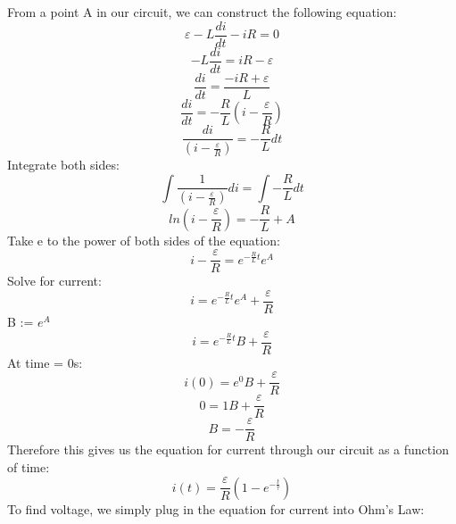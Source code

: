 \documentclass[../Lab.tex]{subfiles}
\begin{document}
From a point A in our circuit, we can construct the following equation:
\begin{equation}
    \varepsilon - L\frac{di}{dt} - iR = 0
\end{equation}
\begin{equation}
    -L\frac{di}{dt} = iR - \varepsilon
\end{equation}
\begin{equation}
    \frac{di}{dt} = \frac{- iR + \varepsilon}{L}
\end{equation}
\begin{equation}
    \frac{di}{dt} = -\frac{R}{L}(i-\frac{\varepsilon}{R})
\end{equation}
\begin{equation}
    \frac{di}{(i-\frac{\varepsilon}{R})} = -\frac{R}{L}dt
\end{equation}
Integrate both sides:
\begin{equation}
    \int{\frac{1}{(i-\frac{\varepsilon}{R})}di} = \int{-\frac{R}{L}dt}
\end{equation}
\begin{equation}
    ln(i-\frac{\varepsilon}{R}) = -\frac{R}{L} + A
\end{equation}
Take e to the power of both sides of the equation:
\begin{equation}
    i-\frac{\varepsilon}{R} = e^{-\frac{R}{L}t}e^A
\end{equation}
Solve for current:
\begin{equation}
    i = e^{-\frac{R}{L}t}e^A + \frac{\varepsilon}{R}
\end{equation}
B := $e^A$
\begin{equation}
    i = e^{-\frac{R}{L}t}B + \frac{\varepsilon}{R}
\end{equation}
At time = 0s:
\begin{equation}
    i(0) = e^0B + \frac{\varepsilon}{R}
\end{equation}
\begin{equation}
    0 = 1B + \frac{\varepsilon}{R}
\end{equation}
\begin{equation}
    B = -\frac{\varepsilon}{R}
\end{equation}
Therefore this gives us the equation for current through our circuit as a function of time:
\begin{equation}
    i(t) = \frac{\varepsilon}{R}(1-e^{-\frac{t}{\tau}})
\end{equation}
To find voltage, we simply plug in the equation for current into Ohm's Law:
\end{document}
